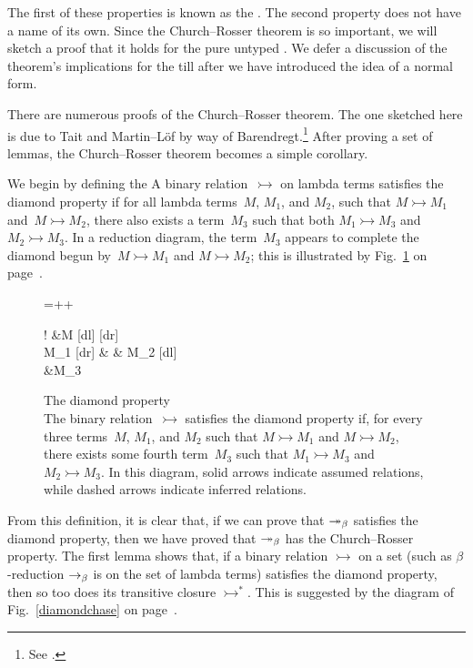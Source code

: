 The first of these properties is known as the . The second property does not have a name of its own. Since the Church--Rosser theorem is so important, we will sketch a proof that it holds for the pure untyped \lambdacalc{}. We defer a discussion of the theorem's implications for the \lambdacalc till after we have introduced the idea of a normal form.

There are numerous proofs of the Church--Rosser theorem. The one sketched here is due to Tait and Martin--L{\"o}f by way of Barendregt.\footnote{See \citet[\S 3.2]{Barendregt:The-Lambda:1984}.} After proving a set of lemmas, the Church--Rosser theorem becomes a simple corollary.

We begin by defining the  A binary relation~$\rightarrowtail$ on lambda terms satisfies the diamond property if for all lambda terms~$M$, $M_{1}$, and $M_{2}$, such that $M \rightarrowtail M_{1}$ and~$M \rightarrowtail M_{2}$, there also exists a term~$M_{3}$ such that both $M_{1} \rightarrowtail M_{3}$ and $M_{2} \rightarrowtail M_{3}$. In a reduction diagram, the term~$M_{3}$ appears to complete the diamond begun by~$M \rightarrowtail M_{1}$ and $M \rightarrowtail M_{2}$; this is illustrated by Fig.~\ref{diamond} on page~\pageref{diamond}.

\begin{figure}[btp]
\caption[The diamond property]{The diamond property\\
The binary relation~$\rightarrowtail$ satisfies the diamond property if, for every three terms~$M$, $M_{1}$, and $M_{2}$ such that $M \rightarrowtail M_{1}$ and $M \rightarrowtail M_{2}$, there exists some fourth term~$M_{3}$ such that $M_{1} \rightarrowtail M_{3}$ and $M_{2} \rightarrowtail M_{3}$. In this diagram, solid arrows indicate assumed relations, while dashed arrows indicate inferred relations.%
}
\label{diamond}
\myfloatalign
\begingroup
{}
\entrymodifiers={++}
\centerline{\xymatrix@!{
&M \ar@{>->}[dl] \ar@{>->}[dr]\\
M_{1} \ar@{>-->}[dr] & & M_{2} \ar@{>-->}[dl]\\
&M_{3}
}}%
\endgroup
\end{figure}

From this definition, it is clear that, if we can prove that $\betared[*]$ satisfies the diamond property, then we have proved that $\betared[*]$ has the Church--Rosser property. The first lemma shows that, if a binary relation $\rightarrowtail$ on a set (such as $\beta$-re\-duc\-tion $\betared$ is on the set of lambda terms) satisfies the diamond property, then so too does its transitive closure $\rightarrowtail^{*}$. This is suggested by the diagram of Fig.~\ref{diamondchase} on page~\pageref{diamondchase}.

